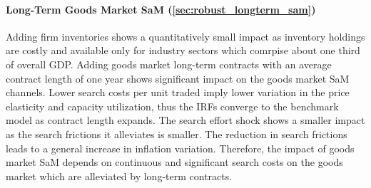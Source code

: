 \documentclass[12pt,3p,authoryear,review]{elsarticle}
\begin{document}
\paragraph{Long-Term Goods Market SaM (\ref{sec:robust_longterm_sam})}%
Adding firm inventories \citep{den2024role} shows a quantitatively small impact as inventory holdings are costly and available only for industry sectors which comrpise about one third of overall GDP. Adding goods market long-term contracts \citep{mathaSearchProductMarket2011,michaillatAggregateDemandIdle2015} with an average contract length of one year shows significant impact on the goods market SaM channels. Lower search costs per unit traded imply lower variation in the price elasticity and capacity utilization, thus the IRFs converge to the benchmark model as contract length expands. The search effort shock shows a smaller impact as the search frictions it alleviates is smaller. The reduction in search frictions leads to a general increase in inflation variation. Therefore, the impact of goods market SaM depends on continuous and significant search costs on the goods market which are alleviated by long-term contracts.%
\end{document}
